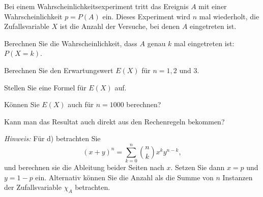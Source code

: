 Bei einem Wahrscheinlichkeitsexperiment tritt das Ereignis $A$
mit einer Wahrscheinlichkeit $p=P(A)$ ein. Dieses Experiment wird
$n$ mal wiederholt, die Zufallsvariable $X$ ist die Anzahl der
Versuche, bei denen $A$ eingetreten ist.
\begin{teilaufgaben}
\item Berechnen Sie die Wahrscheinlichkeit, dass $A$ genau $k$
mal eingetreten ist: $P(X=k)$.
\item Berechnen Sie den Erwartungswert $E(X)$ für $n=1,2$ und $3$.
\item Stellen Sie eine Formel für $E(X)$ auf.
\item Können Sie $E(X)$ auch für $n=1000$ berechnen?
\item Kann man das Resultat auch direkt aus den Rechenregeln bekommen?
\end{teilaufgaben}
{\it Hinweis:} Für d) betrachten Sie
\[
(x+y)^n=\sum_{k=0}^n\binom{n}{k}x^ky^{n-k},
\]
und berechnen sie die Ableitung beider Seiten nach $x$.
Setzen Sie dann $x=p$ und $y=1-p$ ein. Alternativ können Sie die
Anzahl als die Summe von $n$ Instanzen der Zufallsvariable $\chi_A$
betrachten.


